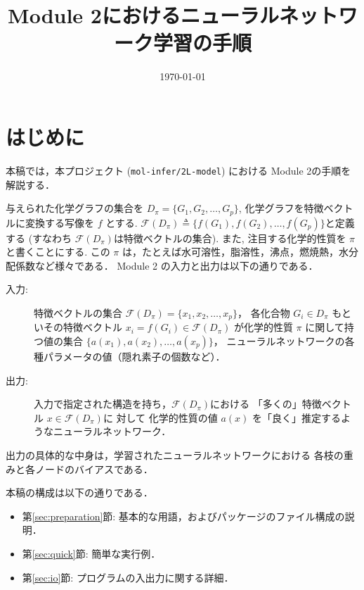 \documentclass[11pt, titlepage, dvipdfmx, twoside]{jarticle}
\title{\huge Module 2におけるニューラルネットワーク学習の手順}
\author{\project}
\newcommand{\project}{{\tt mol-infer/2L-model}}
\newcommand{\secref}[1]{第\ref{sec:#1}節}
\begin{document}
\makeatletter 
\let\c@lstlisting\c@figure
\makeatother
{}
\date{\today}
\maketitle
\thispagestyle{empty}
\tableofcontents
\clearpage
{}


\section{はじめに}
本稿では，本プロジェクト (\project) における Module 2の手順を解説する．

与えられた化学グラフの集合を $D_\pi=\{G_1,G_2,\dots,G_p\}$,
化学グラフを特徴ベクトルに変換する写像を $f$ とする.
${\mathcal F}(D_\pi)\triangleq\{f(G_1),f(G_2),\dots,f(G_p)\}$と定義する
(すなわち ${\mathcal F}(D_\pi)$は特徴ベクトルの集合). 
また, 注目する化学的性質を $\pi$ と書くことにする.
この $\pi$ は，たとえば水可溶性，脂溶性，沸点，燃焼熱，水分配係数など様々である．
Module 2 の入力と出力は以下の通りである．

\begin{oframed}
\begin{description}
\item[入力:] 特徴ベクトルの集合 ${\mathcal F}(D_\pi)=\{x_1,x_2,\dots,x_p\}$，
  各化合物 $G_i\in D_\pi$ もといその特徴ベクトル $x_i=f(G_i)\in{\mathcal F}(D_\pi)$
  が化学的性質 $\pi$ に関して持つ値の集合 $\{a(x_1),a(x_2),\dots,a(x_p)\}$，
  ニューラルネットワークの各種パラメータの値（隠れ素子の個数など）．
\item[出力:] 入力で指定された構造を持ち，${\mathcal F}(D_\pi)$における
  「多くの」特徴ベクトル $x\in {\mathcal F}(D_\pi)$に
  対して
  化学的性質の値 $a(x)$ を「良く」推定するようなニューラルネットワーク．
\end{description}
\end{oframed}
出力の具体的な中身は，学習されたニューラルネットワークにおける
各枝の重みと各ノードのバイアスである．

本稿の構成は以下の通りである．
\begin{itemize}
\item \secref{preparation}: 基本的な用語，およびパッケージのファイル構成の説明．
\item \secref{quick}: 簡単な実行例．
\item \secref{io}: プログラムの入出力に関する詳細．
\end{itemize}

\newpage
\end{document}
